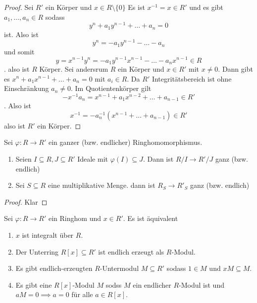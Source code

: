\begin{proof}
	Sei \(R'\) ein Körper und \(x\in R\setminus\{0\}\) Es ist \(x^{-1}=x\in R'\) und es gibt \(a_1,\dots,a_n\in R\) sodass \[y^n+a_1y^{n-1}+\dots+a_n=0\] ist. Also ist 
	\[y^n=-a_1y^{n-1}-\dots-a_n\] und somit \[y=x^{n-1}y^n=-a_1y^{n-1}x^{n-1}-\dots -a_nx^{n-1}\in R\].
	also ist \(R\) Körper.
	Sei andersrum \(R\) ein Körper und \(x\in R'\) mit \(x\neq 0\).
	Dann gibt es \(x^n+a_1x^{n-1}+\dots+a_n=0\) mit \(a_i\in R\).
	Da \(R'\) Integritätsbereich ist ohne Einschränkung \(a_n\neq 0\).
	Im Quotientenkörper gilt \[-x^{-1}a_n=x^{n-1}+a_1x^{n-2}+\dots+a_{n-1}\in R'\]. Also ist \[x^{-1}=-a_n^{-1}(x^{n-1}+\dots +a_{n-1})\in R'\] also ist \(R'\) ein Körper.
\end{proof}
\begin{Lemma}
	Sei \(\varphi\colon R\to R'\) ein ganzer (bzw. endlicher) Ringhomomorphismus.
	\begin{enumerate}
		\item Seien \(I\subseteq R,J\subseteq R'\) Ideale mit \(\varphi(I)\subseteq J\). Dann ist \(R/I\to R'/J\) ganz (bzw. endlich)
		\item Sei \(S\subseteq R\) eine multiplikative Menge. dann ist \(R_S\to R'_S\) ganz (bzw. endlich)
	\end{enumerate}
\end{Lemma}
\begin{proof}
	Klar
\end{proof}
\begin{Lemma}
	Sei \(\varphi\colon R\to R'\) ein Ringhom und \(x\in R'\). Es ist äquivalent
	\begin{enumerate}
		\item \(x\) ist integralt über \(R\).
		\item Der Unterring \(R[x]\subseteq R'\) ist endlich erzeugt als \(R\)-Modul.
		\item Es gibt endlich-erzeugten \(R\)-Untermodul \(M\subseteq R'\) sodass \(1\in M\) und \(xM\subseteq M\).
		\item Es gibt eine \(R[x]\)-Modul \(M\) sodss \(M\) ein endlicher \(R\)-Modul ist und \(aM=0\implies a=0\) für alle \(a\in R[x]\).
	\end{enumerate}
\end{Lemma}
